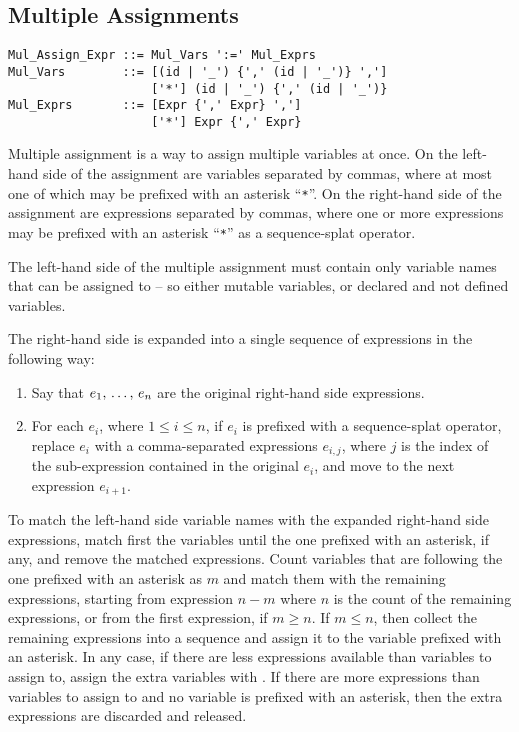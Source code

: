 \subsection{Multiple Assignments}
\label{sec:multiple-assignments}

\syntax\begin{lstlisting}
Mul_Assign_Expr ::= Mul_Vars ':=' Mul_Exprs
Mul_Vars        ::= [(id | '_') {',' (id | '_')} ',']
                    ['*'] (id | '_') {',' (id | '_')}
Mul_Exprs       ::= [Expr {',' Expr} ',']
                    ['*'] Expr {',' Expr}
\end{lstlisting}

Multiple assignment is a way to assign multiple variables at once. On the left-hand side of the assignment are variables separated by commas, where at most one of which may be prefixed with an asterisk ``\lstinline!*!''. On the right-hand side of the assignment are expressions separated by commas, where one or more expressions may be prefixed with an asterisk ``\lstinline!*!'' as a sequence-splat operator. 

The left-hand side of the multiple assignment must contain only variable names that can be assigned to -- so either mutable variables, or declared and not defined variables. 

The right-hand side is expanded into a single sequence of expressions in the following way:
\begin{enumerate}
\item Say that $e_1 ,\, \ldots ,\, e_n$ are the original right-hand side expressions. 

\item For each $e_i$, where $1 \leq i \leq n$, if $e_i$ is prefixed with a sequence-splat operator, replace $e_i$ with a comma-separated expressions $e_{i,j}$, where $j$ is the index of the sub-expression contained in the original $e_i$, and move to the next expression $e_{i+1}$. 
\end{enumerate}

To match the left-hand side variable names with the expanded right-hand side expressions, match first the variables until the one prefixed with an asterisk, if any, and remove the matched expressions. Count variables that are following the one prefixed with an asterisk as $m$ and match them with the remaining expressions, starting from expression $n - m$ where $n$ is the count of the remaining expressions, or from the first expression, if $m \geq n$. If $m \leq n$, then collect the remaining expressions into a sequence and assign it to the variable prefixed with an asterisk. In any case, if there are less expressions available than variables to assign to, assign the extra variables with . If there are more expressions than variables to assign to and no variable is prefixed with an asterisk, then the extra expressions are discarded and released. 

